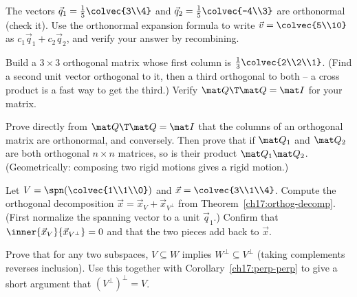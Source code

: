 \begin{exercise}\label{ch17:ex-orthonormal-coords}
The vectors $\vec q_1=\tfrac15\colvec{3\\4}$ and $\vec q_2=\tfrac15\colvec{-4\\3}$ are orthonormal
(check it). Use the orthonormal expansion formula to write $\vec v=\colvec{5\\10}$ as
$c_1\vec q_1+c_2\vec q_2$, and verify your answer by recombining.
\end{exercise}

\begin{exercise}\label{ch17:ex-build-Q}
Build a $3\times3$ orthogonal matrix whose first column is $\tfrac13\colvec{2\\2\\1}$.
(Find a second unit vector orthogonal to it, then a third orthogonal to both -- a cross product is a
fast way to get the third.) Verify $\mat Q\T\mat Q=\mat I$ for your matrix.
\end{exercise}

\begin{exercise}\label{ch17:ex-preserve-proof}
Prove directly from $\mat Q\T\mat Q=\mat I$ that the columns of an orthogonal matrix are
orthonormal, and conversely. Then prove that if $\mat Q_1$ and $\mat Q_2$ are both orthogonal
$n\times n$ matrices, so is their product $\mat Q_1\mat Q_2$. (Geometrically: composing two rigid
motions gives a rigid motion.)
\end{exercise}

\begin{exercise}\label{ch17:ex-split}
Let $V=\spn\!\left(\colvec{1\\1\\0}\right)$ and $\vec x=\colvec{3\\1\\4}$. Compute the orthogonal
decomposition $\vec x=\vec x_V+\vec x_{V^\perp}$ from Theorem~\ref{ch17:orthog-decomp}.
(First normalize the spanning vector to a unit $\vec q_1$.) Confirm that
$\inner{\vec x_V}{\vec x_{V^\perp}}=0$ and that the two pieces add back to $\vec x$.
\end{exercise}

\begin{exercise}\label{ch17:ex-perp-perp-proof}
Prove that for any two subspaces, $V\subseteq W$ implies $W^\perp\subseteq V^\perp$ (taking
complements reverses inclusion). Use this together with Corollary~\ref{ch17:perp-perp} to give a
short argument that $(V^\perp)^\perp=V$.
\end{exercise}

